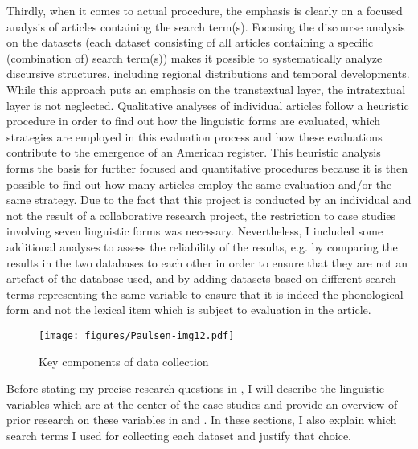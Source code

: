 Thirdly, when it comes to actual procedure, the emphasis is clearly on a focused analysis of articles containing the search term(s). Focusing the discourse analysis on the datasets (each dataset consisting of all articles containing a specific (combination of) search term(s)) makes it possible to systematically analyze discursive structures, including regional distributions and temporal developments. While this approach puts an emphasis on the transtextual layer, the intratextual layer is not neglected. Qualitative analyses of individual articles follow a heuristic procedure in order to find out how the linguistic forms are evaluated, which strategies are employed in this evaluation process and how these evaluations contribute to the emergence of an American register. This heuristic analysis forms the basis for further focused and quantitative procedures because it is then possible to find out how many articles employ the same evaluation and/or the same strategy. Due to the fact that this project is conducted by an individual and not the result of a collaborative research project, the restriction to case studies involving seven linguistic forms was necessary. Nevertheless, I included some additional analyses to assess the reliability of the results, e.g. by comparing the results in the two databases to each other in order to ensure that they are not an artefact of the database used, and by adding datasets based on different search terms representing the same variable to ensure that it is indeed the phonological form and not the lexical item which is subject to evaluation in the article.




\begin{figure}
\texttt{[image: figures/Paulsen-img12.pdf]}
\caption{
Key components of data collection
}
\label{fig:key:12}
\end{figure}

Before stating my precise research questions in , I will describe the linguistic variables which are at the center of the case studies and provide an overview of prior research on these variables in  and . In these sections, I also explain which search terms I used for collecting each dataset and justify that choice.


